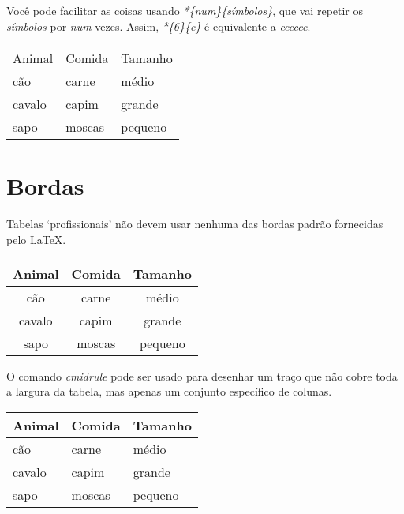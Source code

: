 \documentclass[brazilian]{article}
\begin{document}
Você pode facilitar as coisas usando \emph{*\{num\}\{símbolos\}}, que vai repetir os \emph{símbolos} por \emph{num} vezes. Assim, \emph{*\{6\}\{c\}} é equivalente a \emph{cccccc}. \\

\begin{tabular}{*{3}{p{3cm}}}
    Animal & Comida & Tamanho \\
    cão    & carne  & médio   \\
    cavalo & capim  & grande  \\
    sapo   & moscas & pequeno \\
\end{tabular}

\section{Bordas}

Tabelas ‘profissionais’ não devem usar nenhuma das bordas padrão fornecidas pelo LaTeX.\\

\begin{tabular}{*{3}c}
    \toprule
    Animal & Comida & Tamanho \\
    \midrule
    cão    & carne  & médio   \\
    cavalo & capim  & grande  \\
    sapo   & moscas & pequeno \\
    \bottomrule
\end{tabular}

\vspace{10pt}

O comando \emph{cmidrule} pode ser usado para desenhar um traço que não cobre toda a largura da tabela, mas apenas um conjunto específico de colunas. \\

\begin{tabular}{*{3}{p{3cm}}}
    \toprule
    Animal & Comida & Tamanho \\
    \midrule
    cão    & carne  & médio   \\
    \cmidrule{1-2}
    cavalo & capim  & grande  \\
    \cmidrule{1-1}
    \cmidrule{3-3}
    sapo   & moscas & pequeno \\
    \bottomrule
\end{tabular}

\vspace{10pt}
\end{document}
